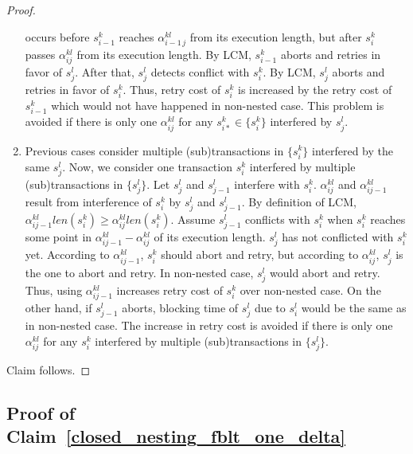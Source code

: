 \documentclass[letter]{sig-alternate}
\begin{document}
\begin{proof}
\begin{enumerate}
occurs before $s_{i-1}^{k}$ reaches $\alpha_{i-1\, j}^{kl}$ from
its execution length, but after $s_{i}^{k}$ passes $\alpha_{ij}^{kl}$
from its execution length. By LCM, $s_{i-1}^{k}$ aborts and retries
in favor of $s_{j}^{l}$. After that, $s_{j}^{l}$ detects conflict
with $s_{i}^{k}$. By LCM, $s_{j}^{l}$ aborts and retries in favor
of $s_{i}^{k}$. Thus, retry cost of $s_{i}^{k}$ is increased by
the retry cost of $s_{i-1}^{k}$ which would not have happened in
non-nested case. This problem is avoided if there is only one $\alpha_{ij}^{kl}$
for any $s_{i*}^{k}\in\{s_{i}^{k}\}$ interfered by $s_{j}^{l}$.
\item Previous cases consider multiple (sub)transactions in $\{s_{i}^{k}\}$
interfered by the same $s_{j}^{l}$. Now, we consider one transaction
$s_{i}^{k}$ interfered by multiple (sub)transactions in $\{s_{j}^{l}\}$.
Let $s_{j}^{l}$ and $s_{j-1}^{l}$ interfere with $s_{i}^{k}$. $\alpha_{ij}^{kl}$
and $\alpha_{ij-1}^{kl}$ result from interference of $s_{i}^{k}$
by $s_{j}^{l}$ and $s_{j-1}^{l}$. By definition of LCM, $\alpha_{ij-1}^{kl}len(s_{i}^{k})\ge\alpha_{ij}^{kl}len(s_{i}^{k})$.
Assume $s_{j-1}^{l}$ conflicts with $s_{i}^{k}$ when $s_{i}^{k}$
reaches some point in $\alpha_{ij-1}^{kl}-\alpha_{ij}^{kl}$ of its
execution length. $s_{j}^{l}$ has not conflicted with $s_{i}^{k}$
yet. According to $\alpha_{ij-1}^{kl}$, $s_{i}^{k}$ should abort
and retry, but according to $\alpha_{ij}^{kl}$, $s_{j}^{l}$ is the
one to abort and retry. In non-nested case, $s_{j}^{l}$ would abort
and retry. Thus, using $\alpha_{ij-1}^{kl}$ increases retry cost
of $s_{i}^{k}$ over non-nested case. On the other hand, if $s_{j-1}^{l}$
aborts, blocking time of $s_{j}^{l}$ due to $s_{i}^{l}$ would be
the same as in non-nested case. The increase in retry cost is avoided
if there is only one $\alpha_{ij}^{kl}$ for any $s_{i}^{k}$ interfered
by multiple (sub)transactions in $\{s_{j}^{l}\}$.
\end{enumerate}
Claim follows.

\end{proof}

\subsection{\label{proof_closed_nesting_fblt_one_delta}Proof of Claim~\ref{closed_nesting_fblt_one_delta}}
\end{document}
